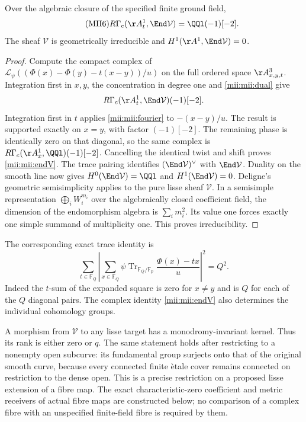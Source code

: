 \begin{theorem}\label{mii:mii:irreducible}
Over the algebraic closure of the specified finite ground field,
\begin{equation}\tag{MII6}\label{mii:mii:endV}
 R\Gamma_c(\AA_t^1,\End\mathcal V)=\QQl(-1)[-2].
\end{equation}
The sheaf $\mathcal V$ is geometrically irreducible and
$H^1(\AA^1,\End\mathcal V)=0$.
\end{theorem}
\begin{proof}
Compute the compact complex of
$\mathcal L_\psi((\Phi(x)-\Phi(y)-t(x-y))/u)$ on the full ordered
space $\AA^3_{x,y,t}$. Integration first in $x,y$, the concentration in
degree one and \eqref{mii:mii:dual} give
\[
 R\Gamma_c(\AA_t^1,\End\mathcal V)(-1)[-2].
\]
Integration first in $t$ applies \eqref{mii:mii:fourier} to
$-(x-y)/u$. The result is supported exactly on $x=y$, with factor
$(-1)[-2]$. The remaining phase is identically zero on that diagonal, so
the same complex is
$R\Gamma_c(\AA_x^1,\QQl)(-1)[-2]$. Cancelling the identical twist and
shift proves \eqref{mii:mii:endV}. The trace pairing identifies
$(\End\mathcal V)^\vee$ with $\End\mathcal V$. Duality on the smooth
line now gives $H^0(\End\mathcal V)=\QQl$ and $H^1(\End\mathcal V)=0$.
Deligne's geometric semisimplicity applies to the pure lisse sheaf
$\mathcal V$. In a semisimple representation $\bigoplus_i W_i^{m_i}$
over the algebraically closed coefficient field, the dimension of the
endomorphism algebra is $\sum_i m_i^2$. Its value one forces exactly one
simple summand of multiplicity one. This proves irreducibility.
\end{proof}

The corresponding exact trace identity is
\begin{equation}\tag{MII7}\label{mii:mii:moment2}
 \sum_{t\in\mathbb F_Q}
 \left|\sum_{x\in\mathbb F_Q}
 \psi\operatorname{Tr}_{\mathbb F_Q/\mathbb F_p}
             \frac{\Phi(x)-tx}{u}\right|^2=Q^2.
\end{equation}
Indeed the $t$-sum of the expanded square is zero for $x\ne y$ and is
$Q$ for each of the $Q$ diagonal pairs. The complex identity
\eqref{mii:mii:endV} also determines the individual cohomology groups.

A morphism from $\mathcal V$ to any lisse target has a
monodromy-invariant kernel. Thus its rank is either zero or $q$. The
same statement holds after restricting to a nonempty open subcurve: its
fundamental group surjects onto that of the original smooth curve, because
every connected finite \`etale cover remains connected on restriction to
the dense open. This is a precise restriction on a proposed lisse
extension of a fibre map. The exact characteristic-zero coefficient
and metric receivers of actual fibre maps are constructed below; no
comparison of a complex fibre with an unspecified finite-field fibre
is required by them.

